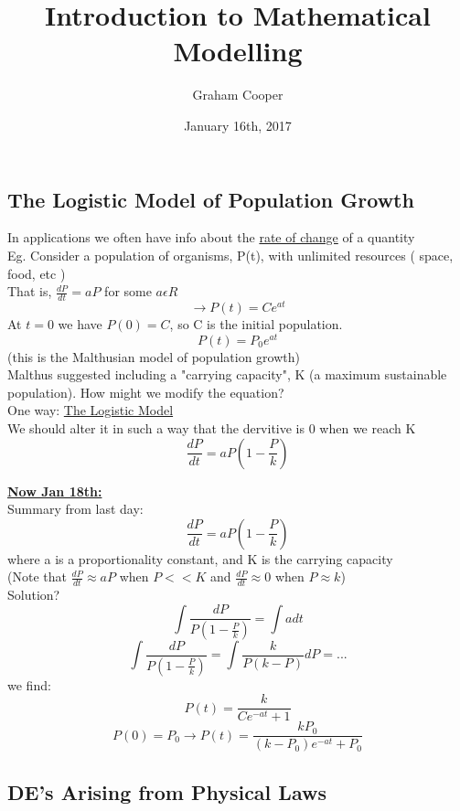 \documentclass[12pt]{article}
\title{\vspace{-15ex}Introduction to Mathematical Modelling\vspace{-1ex}}
\date{January 16th, 2017}
\author{Graham Cooper}
\newcommand{\myt}[1]{\textbf{\underline{#1}}}
\begin{document}
	\maketitle
	
	\subsection*{The Logistic Model of Population Growth}
	In applications we often have info about the \underline{rate of change} of a quantity\\
	Eg. Consider a population of organisms, P(t), with unlimited resources ( space, food, etc )\\
	That is, $\frac{dP}{dt} = aP$ for some $a \epsilon R$\\
	$$\rightarrow P(t) = Ce^{at}$$
	At $t=0$ we have $P(0) = C$, so C is the initial population.\\
	$$P(t) = P_0e^{at}$$
	(this is the Malthusian model of population growth)\\
	Malthus suggested including a "carrying capacity", K (a maximum sustainable population). How might we modify the equation?\\
	
	One way: \underline{The Logistic Model}\\
	We should alter it in such a way that the dervitive is 0 when we reach K\\
	$$\frac{dP}{dt} = aP(1-\frac{P}{k})$$
	
	\myt{Now Jan 18th:}\\
	Summary from last day:\\
	$$\frac{dP}{dt} = aP(1-\frac{P}{k})$$
	where a is a proportionality constant, and K is the carrying capacity\\
	(Note that $\frac{dP}{dt} \approx aP$ when $P << K$ and $\frac{dP}{dt} \approx 0$ when $P \approx k$)\\
	
	Solution?\\
	$$\int \frac{dP}{P(1-\frac{P}{k})} = \int adt$$
	$$\int \frac{dP}{P(1-\frac{P}{k})} = \int \frac{k}{P(k-P)}dP = ...$$
	we find:\\
	$$P(t) = \frac{k}{Ce^{-at} + 1}$$
	$$P(0) = P_0 \rightarrow P(t) = \frac{kP_0}{(k-P_0)e^{-at} + P_0}$$
	
	\subsection*{DE's Arising from Physical Laws}
	
\end{document}
